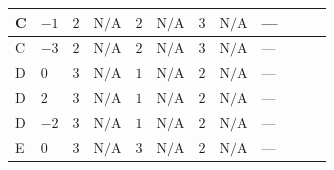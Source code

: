 \documentclass[8pt]{article}
\begin{document}
\begin{landscape}
\begin{longtable}{@{}llcccccc >{\raggedright\arraybackslash}p{0.21\linewidth} >{\raggedright\arraybackslash}p{0.21\linewidth} >{\raggedright\arraybackslash}p{0.21\linewidth}@{}}
\midrule
C & $-1$ & $2$ & $\text{N/A}$ & $2$ & $\text{N/A}$ & $3$ & $\text{N/A}$ & --- & \scriptsize\adjustbox{max width=\linewidth}{$\begin{gathered} +4 {\lambda_{12}^{(1)}}^2\end{gathered}$} & \scriptsize\adjustbox{max width=\linewidth}{$\begin{gathered} +4 {\lambda_{HS_1}^{(1)}}^2\end{gathered}$} \\
\midrule
C & $-3$ & $2$ & $\text{N/A}$ & $2$ & $\text{N/A}$ & $3$ & $\text{N/A}$ & --- & \scriptsize\adjustbox{max width=\linewidth}{$\begin{gathered} +4 {\lambda_{12}^{(1)}}^2\end{gathered}$} & \scriptsize\adjustbox{max width=\linewidth}{$\begin{gathered} +4 {\lambda_{HS_1}^{(1)}}^2\end{gathered}$} \\
\midrule
D & $0$ & $3$ & $\text{N/A}$ & $1$ & $\text{N/A}$ & $2$ & $\text{N/A}$ & --- & \scriptsize\adjustbox{max width=\linewidth}{$\begin{gathered} +2 {\lambda_{12}^{(1)}}^2\end{gathered}$} & \scriptsize\adjustbox{max width=\linewidth}{$\begin{gathered} +4 {\lambda_{HS_1}^{(1)}}^2\end{gathered}$} \\
\midrule
D & $2$ & $3$ & $\text{N/A}$ & $1$ & $\text{N/A}$ & $2$ & $\text{N/A}$ & --- & \scriptsize\adjustbox{max width=\linewidth}{$\begin{gathered} +2 {\lambda_{12}^{(1)}}^2\end{gathered}$} & \scriptsize\adjustbox{max width=\linewidth}{$\begin{gathered} +4 {\lambda_{HS_1}^{(1)}}^2\end{gathered}$} \\
\midrule
D & $-2$ & $3$ & $\text{N/A}$ & $1$ & $\text{N/A}$ & $2$ & $\text{N/A}$ & --- & \scriptsize\adjustbox{max width=\linewidth}{$\begin{gathered} +2 {\lambda_{12}^{(1)}}^2\end{gathered}$} & \scriptsize\adjustbox{max width=\linewidth}{$\begin{gathered} +4 {\lambda_{HS_1}^{(1)}}^2\end{gathered}$} \\
\midrule
E & $0$ & $3$ & $\text{N/A}$ & $3$ & $\text{N/A}$ & $2$ & $\text{N/A}$ & --- & \scriptsize\adjustbox{max width=\linewidth}{$\begin{gathered} +6 {\lambda_{12}^{(1)}}^2\end{gathered}$} & \scriptsize\adjustbox{max width=\linewidth}{$\begin{gathered} +4 {\lambda_{HS_1}^{(1)}}^2\end{gathered}$} \\

\end{longtable}
\end{landscape}
\end{document}
